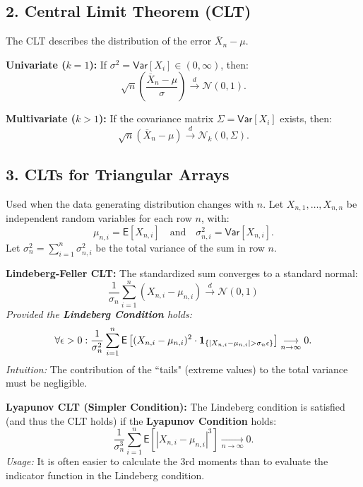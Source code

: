 \subsection*{2. Central Limit Theorem (CLT)}
The CLT describes the distribution of the error $\overline{X}_n - \mu$.

\textbf{Univariate ($k=1$):}
If $\sigma^2 = \mathsf{Var}[X_i] \in (0, \infty)$, then:
\[ \sqrt{n}\left(\frac{\overline{X}_n - \mu}{\sigma}\right) \stackrel{d}{\longrightarrow} \mathcal{N}(0, 1). \]

\textbf{Multivariate ($k > 1$):}
If the covariance matrix $\Sigma = \mathsf{Var}[X_i]$ exists, then:
\[ \sqrt{n}(\overline{X}_n - \mu) \stackrel{d}{\longrightarrow} \mathcal{N}_k(0, \Sigma). \]

\subsection*{3. CLTs for Triangular Arrays}
Used when the data generating distribution changes with $n$.
Let $X_{n,1}, \dots, X_{n,n}$ be independent random variables for each row $n$, with:
\[ \mu_{n,i} = \mathsf{E}[X_{n,i}] \quad \text{and} \quad \sigma_{n,i}^2 = \mathsf{Var}[X_{n,i}]. \]
Let $\sigma_n^2 = \sum_{i=1}^n \sigma_{n,i}^2$ be the total variance of the sum in row $n$.

\textbf{Lindeberg-Feller CLT:}
The standardized sum converges to a standard normal:
\[ \frac{1}{\sigma_n}\sum_{i=1}^n (X_{n,i} - \mu_{n,i}) \stackrel{d}{\longrightarrow} \mathcal{N}(0,1) \]
\textit{Provided the \textbf{Lindeberg Condition} holds:}
\[ \forall \epsilon > 0 : \frac{1}{\sigma_n^2} \sum_{i=1}^n \mathsf{E}\left[ (X_{n,i} - \mu_{n,i})^2 \cdot \boldsymbol{1}_{\{|X_{n,i} - \mu_{n,i}| > \sigma_n \epsilon\}} \right] \underset{n \to \infty}{\longrightarrow} 0. \]
\textit{Intuition:} The contribution of the ``tails" (extreme values) to the total variance must be negligible.

\textbf{Lyapunov CLT (Simpler Condition):}
The Lindeberg condition is satisfied (and thus the CLT holds) if the \textbf{Lyapunov Condition} holds:
\[ \frac{1}{\sigma_n^3} \sum_{i=1}^n \mathsf{E}[|X_{n,i} - \mu_{n,i}|^3] \underset{n \to \infty}{\longrightarrow} 0. \]
\textit{Usage:} It is often easier to calculate the 3rd moments than to evaluate the indicator function in the Lindeberg condition.


